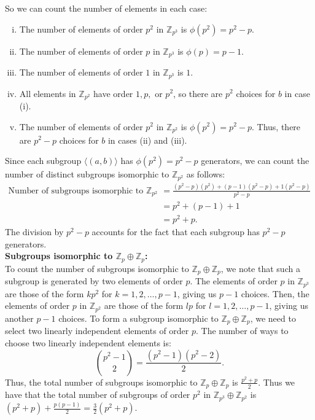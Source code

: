 \documentclass{article}
\def\zz{{\mathbb Z}}
\begin{document}
So we can count the number of elements in each case:
\begin{enumerate}[(i)]
    \item The number of elements of order $p^2$ in $\zz_{p^3}$ is $\phi(p^2) = p^2 - p$. 
    \item The number of elements of order $p$ in $\zz_{p^3}$ is $\phi(p) = p - 1$.
    \item The number of elements of order $1$ in $\zz_{p^3}$ is $1$.
    \item All elements in $\zz_{p^2}$ have order $1, p,$ or $p^2$, so there are $p^2$ choices for $b$ in case (i).
    \item The number of elements of order $p^2$ in $\zz_{p^2}$ is $\phi(p^2) = p^2 - p$. Thus, there are $p^2 - p$ choices for $b$ in cases (ii) and (iii).
\end{enumerate}
Since each subgroup $\langle (a,b) \rangle$ has $\phi(p^2) = p^2 - p$ generators, we can count the number of distinct subgroups isomorphic to $\zz_{p^2}$ as follows:
\begin{align*}
    \text{Number of subgroups isomorphic to } \zz_{p^2} &= \frac{(p^2 - p)(p^2) + (p - 1)(p^2 - p) + 1(p^2 - p)}{p^2 - p} \\
    &= p^2 + (p - 1) + 1 \\
    &= p^2 + p.
\end{align*}
The division by $p^2 - p$ accounts for the fact that each subgroup has $p^2 - p$ generators. \\
\textbf{Subgroups isomorphic to $\zz_p \oplus \zz_p$:} \\
To count the number of subgroups isomorphic to $\zz_p \oplus \zz_p$, we note that such a subgroup is generated by two elements of order $p$. The elements of order $p$ in $\zz_{p^3}$ are those of the form $kp^2$ for $k = 1, 2, \ldots, p-1$, giving us $p-1$ choices. Then, the elements of order $p$ in $\zz_{p^2}$ are those of the form $lp$ for $l = 1, 2, \ldots, p-1$, giving us another $p-1$ choices. To form a subgroup isomorphic to $\zz_p \oplus \zz_p$, we need to select two linearly independent elements of order $p$. The number of ways to choose two linearly independent elements is:
\[
\binom{p^2 - 1}{2} = \frac{(p^2 - 1)(p^2 - 2)}{2}.
\]
Thus, the total number of subgroups isomorphic to $\zz_p \oplus \zz_p$ is $\frac{p^2 + p}{2}$.
Thus we have that the total number of subgroups of order $p^2$ in $\zz_{p^3} \oplus \zz_{p^2}$ is $(p^2 + p) + \frac{p(p-1)}{2} = \frac{3}{2}\left(p^2 + p\right)$. \\
\end{document}
